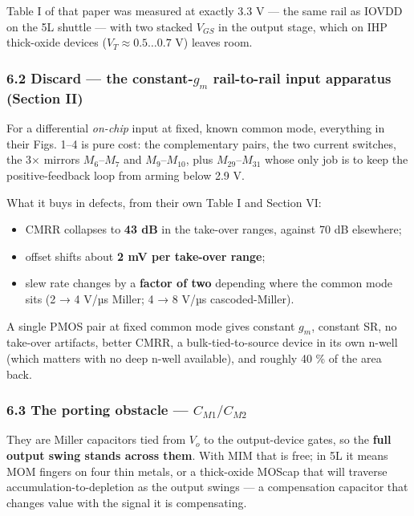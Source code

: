 \documentclass[
  10pt,
  a4paper,
]{article}
\providecommand{\tightlist}{%
  \setlength{\itemsep}{0pt}\setlength{\parskip}{0pt}}
\begin{document}
Table I of that paper was measured at exactly 3.3 V --- the same rail as
IOVDD on the 5L shuttle --- with two stacked \(V_{GS}\) in the output
stage, which on IHP thick-oxide devices (\(V_T \approx 0.5\ldots0.7\) V)
leaves room.

\hypertarget{discard-the-constant-g_m-rail-to-rail-input-apparatus-section-ii}{%
\subsubsection{\texorpdfstring{6.2 Discard --- the constant-\(g_m\)
rail-to-rail input apparatus (Section
II)}{6.2 Discard --- the constant-g\_m rail-to-rail input apparatus (Section II)}}\label{discard-the-constant-g_m-rail-to-rail-input-apparatus-section-ii}}

For a differential \emph{on-chip} input at fixed, known common mode,
everything in their Figs. 1--4 is pure cost: the complementary pairs,
the two current switches, the 3× mirrors \(M_6\)--\(M_7\) and
\(M_9\)--\(M_{10}\), plus \(M_{29}\)--\(M_{31}\) whose only job is to
keep the positive-feedback loop from arming below 2.9 V.

What it buys in defects, from their own Table I and Section VI:

\begin{itemize}
\tightlist
\item
  CMRR collapses to \textbf{43 dB} in the take-over ranges, against 70
  dB elsewhere;
\item
  offset shifts about \textbf{2 mV per take-over range};
\item
  slew rate changes by a \textbf{factor of two} depending where the
  common mode sits (2 → 4 V/µs Miller; 4 → 8 V/µs cascoded-Miller).
\end{itemize}

A single PMOS pair at fixed common mode gives constant \(g_m\), constant
SR, no take-over artifacts, better CMRR, a bulk-tied-to-source device in
its own n-well (which matters with no deep n-well available), and
roughly 40 \% of the area back.

\hypertarget{the-porting-obstacle-c_m1c_m2}{%
\subsubsection{\texorpdfstring{6.3 The porting obstacle ---
\(C_{M1}/C_{M2}\)}{6.3 The porting obstacle --- C\_\{M1\}/C\_\{M2\}}}\label{the-porting-obstacle-c_m1c_m2}}

They are Miller capacitors tied from \(V_o\) to the output-device gates,
so the \textbf{full output swing stands across them}. With MIM that is
free; in 5L it means MOM fingers on four thin metals, or a thick-oxide
MOScap that will traverse accumulation-to-depletion as the output swings
--- a compensation capacitor that changes value with the signal it is
compensating.
\end{document}

